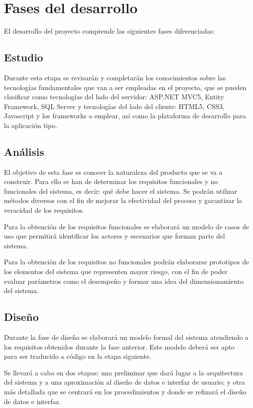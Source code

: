 \section{Fases del desarrollo}
El desarrollo del proyecto comprende las siguientes fases diferenciadas:

\subsection{Estudio}
Durante esta etapa se revisarán y completarán los conocimientos sobre las tecnologías fundamentales que van a ser empleadas en el proyecto, que se pueden clasificar como tecnologías del lado del servidor: ASP.NET MVC5, Entity Framework, SQL Server y tecnologías del lado del cliente: HTML5, CSS3, Javascript y los frameworks a emplear, así como la plataforma de desarrollo para la aplicación tipo.

\subsection{Análisis}
El objetivo de esta fase es conocer la naturaleza del producto que se va a construir. Para ello se han de determinar los requisitos funcionales y no funcionales del sistema, es decir: qué debe hacer el sistema. Se podrán utilizar métodos diversos con el fin de mejorar la efectividad  del proceso y garantizar la veracidad de los requisitos.

Para la obtención de los requisitos funcionales se elaborará un modelo de casos de uso que permitirá identificar los actores y escenarios que forman parte del sistema.

Para la obtención de los requisitos no funcionales podrán elaborarse prototipos de los elementos del sistema que representen mayor riesgo, con el fin de poder evaluar parámetros como el desempeño y formar una idea del dimensionamiento del sistema.

\subsection{Diseño}
Durante la fase de diseño se elaborará un modelo formal del sistema atendiendo a los requisitos obtenidos durante la fase anterior. Este modelo deberá ser apto para ser traducido a código en la etapa siguiente.

Se llevará a cabo en dos etapas: una preliminar que dará lugar a la arquitectura del sistema y a una aproximación al diseño de datos e interfaz de usuario; y otra más detallada que se centrará en los procedimientos y donde se refinará el diseño de datos e interfaz.

